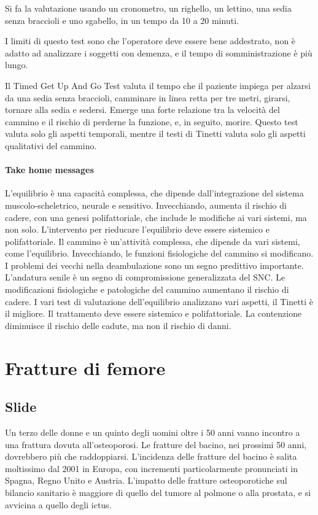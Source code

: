 Si fa la valutazione usando un cronometro, un righello, un lettino, una sedia
senza braccioli e uno sgabello, in un tempo da 10 a 20 minuti.

I limiti di questo test sono che l'operatore deve essere bene addestrato, non è 
adatto ad analizzare i soggetti con demenza, e il tempo di somministrazione è più
lungo.

Il Timed Get Up And Go Test valuta il tempo che il paziente impiega per alzarsi
da una sedia senza braccioli, camminare in linea retta per tre metri, girarsi,
tornare alla sedia e sedersi. Emerge una forte relazione tra la velocità del
cammino e il rischio di perderne la funzione, e, in seguito, morire. Questo test
valuta solo gli aspetti temporali, mentre il testi di Tinetti valuta solo gli
aspetti qualitativi del cammino.

\paragraph{Take home messages}
L'equilibrio è una capacità complessa, che dipende dall'integrazione del sistema
muscolo-scheletrico, neurale e sensitivo.
Invecchiando, aumenta il rischio di cadere, con una genesi polifattoriale, che
include le modifiche ai vari sistemi, ma non solo.
L'intervento per rieducare l'equilibrio deve essere sistemico e polifattoriale.
Il cammino è un'attività complessa, che dipende da vari sistemi, come l'equilibrio.
Invecchiando, le funzioni fisiologiche del cammino si modificano.
I problemi dei vecchi nella deambulazione sono un segno predittivo importante.
L'andatura senile è un segno di compromissione generalizzata del SNC.
Le modificazioni fisiologiche e patologiche del cammino aumentano il rischio di
cadere.
I vari test di valutazione dell'equilibrio analizzano vari aspetti, il Tinetti è
il migliore.
Il trattamento deve essere sistemico e polifattoriale.
La contenzione diminuisce il rischio delle cadute, ma non il rischio di danni.

\section{Fratture di femore}
\subsection{Slide}

Un terzo delle donne e un quinto degli uomini oltre i 50 anni vanno incontro a
una frattura dovuta all'osteoporosi. Le fratture del bacino, nei prossimi 50
anni, dovrebbero più che raddoppiarsi. L'incidenza delle fratture del bacino è
salita moltissimo dal 2001 in Europa, con incrementi particolarmente pronunciati
in Spagna, Regno Unito e Austria. L'impatto delle fratture osteoporotiche sul
bilancio sanitario è maggiore di quello del tumore al polmone o alla prostata,
e si avvicina a quello degli ictus.

